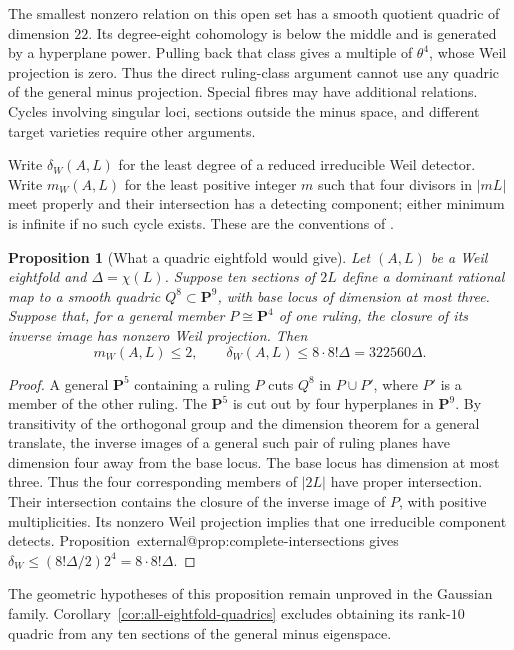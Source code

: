 \documentclass[11pt]{article}
\makeatletter
\providecommand{\compref}[1]{\csname external@#1\endcsname}
\newtheorem{proposition}[theorem]{Proposition}
\theoremstyle{definition}
\theoremstyle{remark}
\makeatother
\begin{document}
The smallest nonzero relation on this open set has a smooth
quotient quadric of dimension $22$. Its degree-eight cohomology
is below the middle and is generated by a hyperplane power.
Pulling back that class gives a multiple of $\theta^4$, whose
Weil projection is zero. Thus the direct ruling-class argument
cannot use any quadric of the general minus projection.
Special fibres may have additional relations. Cycles involving
singular loci, sections outside the minus space, and different
target varieties require other arguments.

Write $\delta_W(A,L)$ for the least degree of a reduced irreducible
Weil detector. Write $m_W(A,L)$ for the least positive integer $m$
such that four divisors in $|mL|$ meet properly and their intersection
has a detecting component; either minimum is infinite if no such
cycle exists. These are the conventions of
\cite[Proposition~\compref{prop:complete-intersections}]{CompanionA}.

\begin{proposition}[What a quadric eightfold would give]\label{prop:quadric-gate}
Let $(A,L)$ be a Weil eightfold and $\Delta=\chi(L)$. Suppose ten sections of $2L$ define a dominant rational map to a smooth quadric $Q^8\subset\mathbf P^9$, with base locus of dimension at most three. Suppose that, for a general member $P\cong\mathbf P^4$ of one ruling, the closure of its inverse image has nonzero Weil projection. Then
\[
 m_W(A,L)\le2,\qquad \delta_W(A,L)\le8\cdot8!\Delta=322560\Delta.
\]
\end{proposition}

\begin{proof}
A general $\mathbf P^5$ containing a ruling $P$ cuts $Q^8$ in $P\cup P'$, where $P'$ is a member of the other ruling. The $\mathbf P^5$ is cut out by four hyperplanes in $\mathbf P^9$. By transitivity of the orthogonal group and the dimension theorem for a general translate, the inverse images of a general such pair of ruling planes have dimension four away from the base locus. The base locus has dimension at most three. Thus the four corresponding members of $|2L|$ have proper intersection. Their intersection contains the closure of the inverse image of $P$, with positive multiplicities. Its nonzero Weil projection implies that one irreducible component detects. Proposition~\compref{prop:complete-intersections} gives
$\delta_W\le(8!\Delta/2)2^4=8\cdot8!\Delta$.
\end{proof}

The geometric hypotheses of this proposition remain unproved in
the Gaussian family. Corollary~\ref{cor:all-eightfold-quadrics}
excludes obtaining its rank-$10$ quadric from any ten sections
of the general minus eigenspace.
\end{document}
